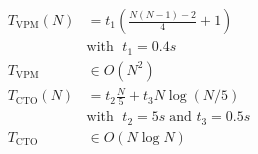 \documentclass[a4paper]{article}
\begin{document}
\begin{align*}
  T_\text{VPM}(N) &= t_1 \left( \frac{N(N-1) - 2}{4} + 1 \right) \\
  &\text{with } \; t_1 = 0.4s \\
  T_\text{VPM} &\in O(N^2) \\
  T_\text{CTO}(N) &= t_2\frac{N}{5} + t_3N\log(N/5) \\
  &\text{with } \; t_2 = 5s \; \text{and } t_3 = 0.5s \\
  T_\text{CTO} &\in O(N\log N)
\end{align*}
\end{document}

